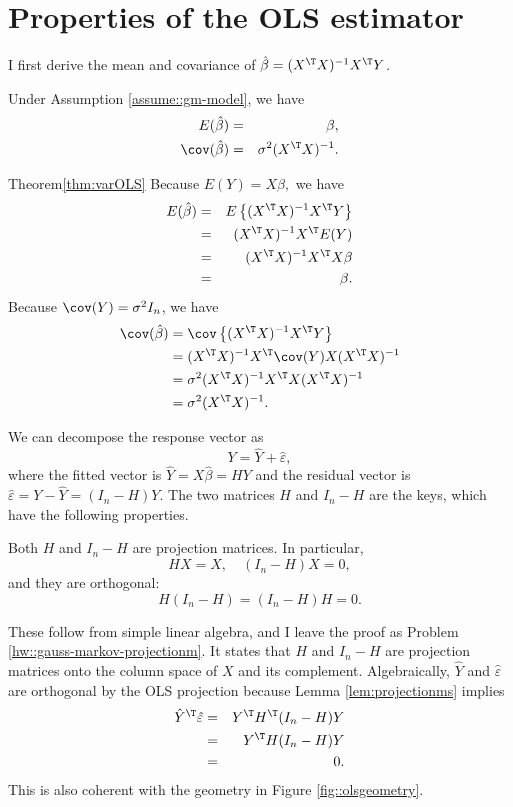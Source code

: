 \section{Properties of the OLS estimator}

I first derive the mean and covariance of $\hat{\beta}=(X^{\T}X)^{-1}X^{\T}Y$.
\begin{theorem}
\label{thm:varOLS}Under Assumption  \ref{assume::gm-model}, we have 
\begin{eqnarray*}
E(\hat{\beta}) &=& \beta,\\ 
\cov(\hat{\beta}) &=&  \sigma^{2}(X^{\T}X)^{-1}.
\end{eqnarray*}
\end{theorem}

\begin{myproof}{Theorem}{\ref{thm:varOLS}}
Because $E(Y)=X\beta,$ we have
\begin{eqnarray*}
E(\hat{\beta}) &=& E\left\{ (X^{\T}X)^{-1}X^{\T}Y\right\} \\
 &=& (X^{\T}X)^{-1}X^{\T}E(Y) \\
 &=&(X^{\T}X)^{-1}X^{\T}X\beta \\
 &=&\beta.
\end{eqnarray*}
 Because $\cov(Y)=\sigma^{2}I_{n}$, we have 
\begin{align*}
\cov(\hat{\beta}) & =\cov\left\{ (X^{\T}X)^{-1}X^{\T}Y\right\}  \\
&=(X^{\T}X)^{-1}X^{\T}\cov(Y)X(X^{\T}X)^{-1}\\
 & =\sigma^{2}(X^{\T}X)^{-1}X^{\T}X(X^{\T}X)^{-1} \\
 & =\sigma^{2}(X^{\T}X)^{-1}.
\end{align*}
\end{myproof}


We can decompose the response vector as 
\[
Y=\hat{Y}+\hat{\varepsilon},
\]
 where the fitted vector is $\hat{Y}=X\hat{\beta}=HY$ and the
residual vector is $\hat{\varepsilon}=Y-\hat{Y}=(I_{n}-H)Y.$ The two
matrices $H$ and $I_{n}-H$ are the keys, which have the following
properties. 



\begin{lemma}
\label{lem:projectionms}
Both $H$ and $I_{n}-H$ are projection matrices. In particular, 
$$
HX=X,\quad (I_{n}-H)X=0 , 
$$ 
and they are orthogonal: 
$$
H(I_{n}-H)=(I_{n}-H)H=0.
$$
\end{lemma}

These follow from simple linear algebra, and I leave the proof as Problem \ref{hw::gauss-markov-projectionm}. It states that $H$ and $I_{n}-H$ are projection matrices onto the column space of $X$ and its complement. 
 Algebraically, $\hat{Y}$ and $\hat{\varepsilon}$ are orthogonal
by the OLS projection because Lemma \ref{lem:projectionms} implies
\begin{eqnarray*}
\hat{Y}^{\T}\hat{\varepsilon} &=& Y^{\T}H^{\T}(I_{n}-H)Y  \\
&=&  Y^{\T}H(I_{n}-H)Y \\
&=& 0.
\end{eqnarray*}
This is also coherent with the geometry in Figure \ref{fig::olsgeometry}. 
 

